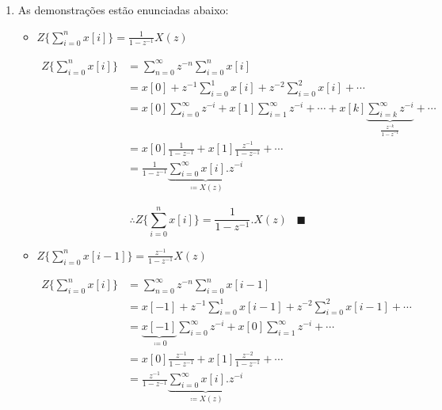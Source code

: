 \documentclass{article}
\begin{document}
\begin{enumerate}
\item %

As demonstrações estão enunciadas abaixo:

\begin{itemize}
	\item $Z\{\sum_{i=0}^{n}x[i] \} = \frac{1}{1-z^{-1}}X(z)$
	
	\begin{equation}
	\begin{split}
	Z\{\sum_{i=0}^{n}x[i] \} & = \sum_{n=0}^{\infty} z^{-n} \sum_{i=0}^{n} x[i] \\
	& = x[0] + z^{-1} \sum_{i=0}^{1} x[i] + z^{-2} \sum_{i=0}^{2} x[i] + \cdots \\
	& = x[0] \sum_{i=0}^{\infty} z^{-i} + x[1] \sum_{i=1}^{\infty} z^{-i} + \cdots + x[k] 
	\underbrace{\sum_{i=k}^{\infty} z^{-i}}_{\frac{z^{-k}}{1 - z^{-1}}} + \cdots\\
	& = x[0] \frac{1}{1 - z^{-1}} + x[1] \frac{z^{-1}}{1 - z^{-1}} + \cdots \\
	& = \frac{1}{1 - z^{-1}} \underbrace{\sum_{i=0}^{\infty} x[i].z^{-i}}_{\coloneqq X(z)}
	\end{split}
	\end{equation}

	\begin{equation}
	\therefore Z\{\sum_{i=0}^{n}x[i] \} = \frac{1}{1-z^{-1}}.X(z) \hspace{10pt} \blacksquare
	\end{equation}
	
	\item $Z\{\sum_{i=0}^{n}x[i-1] \} = \frac{z^{-1}}{1-z^{-1}}X(z)$

	\begin{equation}
	\begin{split}
	Z\{\sum_{i=0}^{n}x[i] \} & = \sum_{n=0}^{\infty} z^{-n} \sum_{i=0}^{n} x[i-1] \\
	& = x[-1] + z^{-1} \sum_{i=0}^{1} x[i-1] + z^{-2} \sum_{i=0}^{2} x[i-1] + \cdots \\
	& = \underbrace{x[-1]}_{\coloneqq 0} \sum_{i=0}^{\infty} z^{-i} + x[0] \sum_{i=1}^{\infty} z^{-i} + \cdots \\
	& = x[0] \frac{z^{-1}}{1 - z^{-1}} + x[1] \frac{z^{-2}}{1 - z^{-1}} + \cdots \\
	& = \frac{z^{-1}}{1 - z^{-1}} \underbrace{\sum_{i=0}^{\infty} x[i].z^{-i}}_{\coloneqq X(z)}
	\end{split}
	\end{equation}


\end{itemize}
\end{enumerate}
\end{document}
